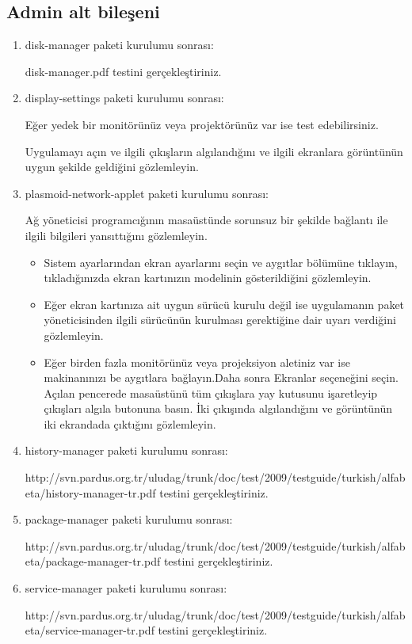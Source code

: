 \documentclass[a4paper,10pt]{article}
\begin{document}
\subsection*{Admin alt bileşeni}
\begin{enumerate} 
\item disk-manager paketi kurulumu sonrası:

disk-manager.pdf testini gerçekleştiriniz.
% 
\item display-settings paketi kurulumu sonrası:
  
Eğer yedek bir monitörünüz veya projektörünüz var ise test edebilirsiniz.

Uygulamayı açın ve ilgili çıkışların algılandığını ve ilgili ekranlara görüntünün uygun şekilde geldiğini gözlemleyin.

\item plasmoid-network-applet paketi kurulumu sonrası:

Ağ yöneticisi programcığının masaüstünde sorunsuz bir şekilde bağlantı ile ilgili bilgileri yansıttığını gözlemleyin.

\begin{itemize}
\item Sistem ayarlarından ekran ayarlarını seçin ve aygıtlar bölümüne tıklayın, tıkladığınızda ekran kartınızın modelinin gösterildiğini gözlemleyin.

\item Eğer ekran kartınıza ait uygun sürücü kurulu değil ise uygulamanın paket yöneticisinden ilgili sürücünün kurulması gerektiğine dair uyarı verdiğini gözlemleyin.

\item Eğer birden fazla monitörünüz veya projeksiyon aletiniz var ise makinanınızı be aygıtlara bağlayın.Daha sonra Ekranlar seçeneğini seçin. Açılan pencerede masaüstünü tüm çıkışlara yay kutusunu işaretleyip çıkışları algıla butonuna basın. İki çıkışında algılandığını ve görüntünün iki ekrandada çıktığını gözlemleyin. 
\end{itemize}

 \item history-manager paketi kurulumu sonrası:

 http://svn.pardus.org.tr/uludag/trunk/doc/test/2009/testguide/turkish/alfabeta/history-manager-tr.pdf  testini gerçekleştiriniz.

\item package-manager paketi kurulumu sonrası:

http://svn.pardus.org.tr/uludag/trunk/doc/test/2009/testguide/turkish/alfabeta/package-manager-tr.pdf  testini gerçekleştiriniz.

\item service-manager paketi kurulumu sonrası:

http://svn.pardus.org.tr/uludag/trunk/doc/test/2009/testguide/turkish/alfabeta/service-manager-tr.pdf  testini gerçekleştiriniz.

\end{enumerate}
\end{document}
